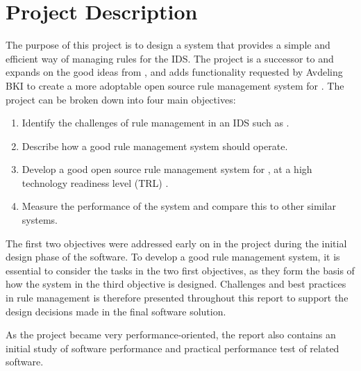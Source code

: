 \section{Project Description}
The purpose of this project is to design a system
that provides a simple and efficient way of managing rules for the
\snort{} IDS. The project is a successor to \bhtb{} and
 expands on the good ideas from \bhtb{}, and adds functionality
requested by Avdeling BKI to create a more adoptable open source rule
management system for \snort{}. The project can be broken down into four main
objectives:

\begin{enumerate}
\item Identify the challenges of rule management in an IDS such as \snort{}.
\item Describe how a good rule management system should operate.
\item Develop a good open source rule management system for \snort{}, at a high
technology readiness level (TRL) \cite{TRL}.
\item Measure the performance of the system and compare this to other similar
systems.
\end{enumerate} 
The first two objectives were addressed early on in the project during the
initial design phase of the software. To develop a good rule management system,
it is essential to consider the tasks in the two first objectives, as they form
the basis of how the system in the third objective is designed. Challenges and
best practices in rule management is therefore presented throughout this report
to support the design decisions made in the final software solution.

As the project became very performance-oriented, the report also contains an
initial study of software performance and practical performance test of
related software.

